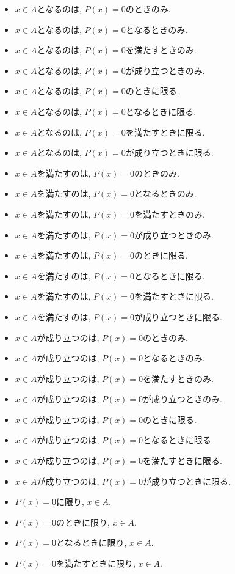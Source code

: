 \documentclass[a4paper,12pt,draft]{amsart}
\newcommand{\PPP}[1]{P(#1)=0}
\begin{document}
\begin{itemize}
\item $x\in A$となるのは, $\PPP{x}$のときのみ.
\item $x\in A$となるのは, $\PPP{x}$となるときのみ.
\item $x\in A$となるのは, $\PPP{x}$を満たすときのみ.
\item $x\in A$となるのは, $\PPP{x}$が成り立つときのみ.
\item $x\in A$となるのは, $\PPP{x}$のときに限る.
\item $x\in A$となるのは, $\PPP{x}$となるときに限る.
\item $x\in A$となるのは, $\PPP{x}$を満たすときに限る.
\item $x\in A$となるのは, $\PPP{x}$が成り立つときに限る.
\item $x\in A$を満たすのは, $\PPP{x}$のときのみ.
\item $x\in A$を満たすのは, $\PPP{x}$となるときのみ.
\item $x\in A$を満たすのは, $\PPP{x}$を満たすときのみ.
\item $x\in A$を満たすのは, $\PPP{x}$が成り立つときのみ.
\item $x\in A$を満たすのは, $\PPP{x}$のときに限る.
\item $x\in A$を満たすのは, $\PPP{x}$となるときに限る.
\item $x\in A$を満たすのは, $\PPP{x}$を満たすときに限る.
\item $x\in A$を満たすのは, $\PPP{x}$が成り立つときに限る.
\item $x\in A$が成り立つのは, $\PPP{x}$のときのみ.
\item $x\in A$が成り立つのは, $\PPP{x}$となるときのみ.
\item $x\in A$が成り立つのは, $\PPP{x}$を満たすときのみ.
\item $x\in A$が成り立つのは, $\PPP{x}$が成り立つときのみ.
\item $x\in A$が成り立つのは, $\PPP{x}$のときに限る.
\item $x\in A$が成り立つのは, $\PPP{x}$となるときに限る.
\item $x\in A$が成り立つのは, $\PPP{x}$を満たすときに限る.
\item $x\in A$が成り立つのは, $\PPP{x}$が成り立つときに限る.
\item $\PPP{x}$に限り, $x\in A$.
\item $\PPP{x}$のときに限り, $x\in A$.
\item $\PPP{x}$となるときに限り, $x\in A$.
\item $\PPP{x}$を満たすときに限り, $x\in A$.

\end{itemize}
\end{document}
